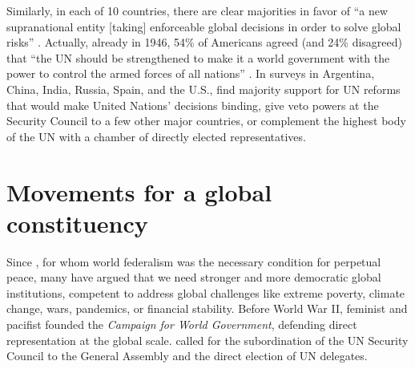 \documentclass[12pt,english]{article}
\begin{document}
Similarly, in each of 10 countries, there are clear majorities in favor of ``a new supranational entity [taking] enforceable global decisions in order to solve global risks'' \citep{global_challenges_foundation_attitudes_2018}. Actually, already in 1946, 54\% of Americans agreed (and 24\% disagreed) that ``the UN should be strengthened to make it a world government with the power to control the armed forces of all nations'' \citep{gallup_seventy_1946}. 
In surveys in Argentina, China, India, Russia, Spain, and the U.S., \citet{ghassim_public_2022} find majority support for UN reforms that would make United Nations' decisions binding, give veto powers at the Security Council to a few other major countries, or complement the highest body of the UN with a chamber of directly elected representatives. 



\section{Movements for a global constituency}
Since \citet{kant_zum_1795}, for whom world federalism was the necessary condition for perpetual peace, many have argued that we need stronger and more democratic global institutions, competent to address global challenges like extreme poverty, climate change, wars, pandemics, or financial stability. 
Before World War II, feminist and pacifist \citet{maverick_lloyd_chaos_1937} founded the \textit{Campaign for World Government}, defending direct representation at the global scale. 
\citet{einstein_general_1947} called for the subordination of the UN Security Council to the General Assembly and the direct election of UN delegates. 
\end{document}

